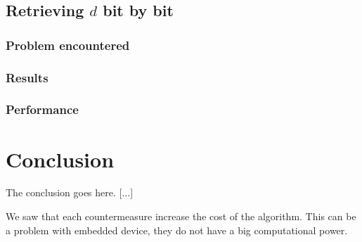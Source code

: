 \documentclass[journal]{IEEEtran}
\begin{document}
\subsection{Retrieving $d$ bit by bit}

\subsubsection{Problem encountered}

\subsubsection{Results}
\subsubsection{Performance}

\section{Conclusion}
The conclusion goes here.
[...]

We saw that each countermeasure increase the cost of the algorithm. This can be a problem with embedded device, they do not have a big computational power.

\clearpage




%
\end{document}
